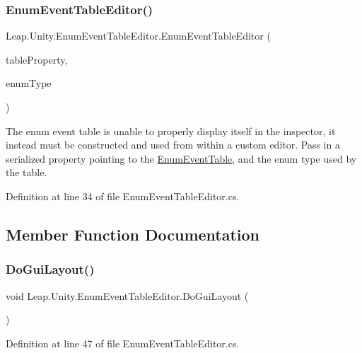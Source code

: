 \subsubsection{\texorpdfstring{EnumEventTableEditor()}{EnumEventTableEditor()}}
{\footnotesize\ttfamily Leap.\+Unity.\+Enum\+Event\+Table\+Editor.\+Enum\+Event\+Table\+Editor (\begin{DoxyParamCaption}\item[{Serialized\+Property}]{table\+Property,  }\item[{Type}]{enum\+Type }\end{DoxyParamCaption})}



The enum event table is unable to properly display itself in the inspector, it instead must be constructed and used from within a custom editor. Pass in a serialized property pointing to the \mbox{\hyperlink{class_leap_1_1_unity_1_1_enum_event_table}{Enum\+Event\+Table}}, and the enum type used by the table. 



Definition at line 34 of file Enum\+Event\+Table\+Editor.\+cs.



\subsection{Member Function Documentation}
\mbox{\label{class_leap_1_1_unity_1_1_enum_event_table_editor_a0750f6e4ebe155b598189387c896ade0}} 
\subsubsection{\texorpdfstring{DoGuiLayout()}{DoGuiLayout()}}
{\footnotesize\ttfamily void Leap.\+Unity.\+Enum\+Event\+Table\+Editor.\+Do\+Gui\+Layout (\begin{DoxyParamCaption}{ }\end{DoxyParamCaption})}



Definition at line 47 of file Enum\+Event\+Table\+Editor.\+cs.

\mbox{\label{class_leap_1_1_unity_1_1_enum_event_table_editor_aa8e88f2c5b8385d9d99a2eb844aa7b27}} 
